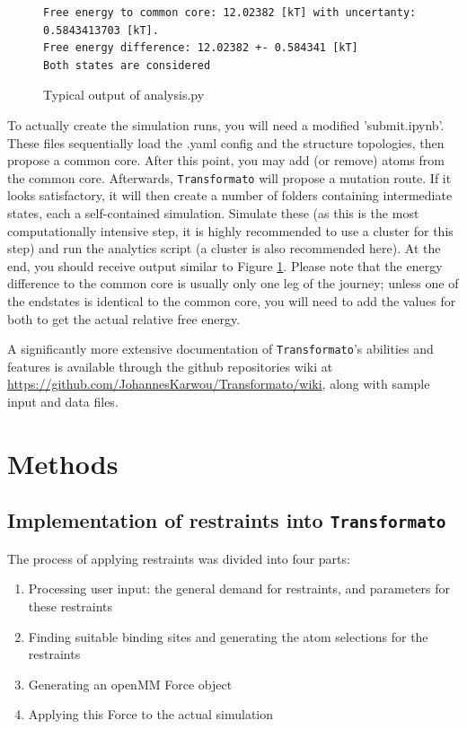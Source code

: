 \documentclass[oneside]{scrreprt}
\begin{document}
\begin{figure}\small

\begin{verbatim}
Free energy to common core: 12.02382 [kT] with uncertanty: 0.5843413703 [kT].
Free energy difference: 12.02382 +- 0.584341 [kT]
Both states are considered
\end{verbatim}
\label{fig:anaoutput}
\caption{Typical output of analysis.py}
\end{figure}

To actually create the simulation runs, you will need a modified 'submit.ipynb'. These files sequentially load the .yaml config and the structure topologies, then propose a common core. After this point, you may add (or remove) atoms from the common core. Afterwards, \texttt{Transformato} will propose a mutation route. If it looks satisfactory, it will then create a number of folders containing intermediate states, each a self-contained simulation. Simulate these (as this is the most computationally intensive step, it is highly recommended to use a cluster for this step) and run the analytics script (a cluster is also recommended here). At the end, you should receive output similar to Figure \ref{fig:anaoutput}. Please note that the energy difference to the common core is usually only one leg of the journey; unless one of the endstates is identical to the common core, you will need to add the values for both to get the actual relative free energy. 

A significantly more extensive documentation of \texttt{Transformato}'s abilities and features is available through the github repositories wiki at \url{https://github.com/JohannesKarwou/Transformato/wiki}, along with sample input and data files.


\chapter{Methods}
\section{Implementation of restraints into \texttt{Transformato}}

The process of applying restraints was divided into four parts:

\begin{enumerate}
    \item Processing user input: the general demand for restraints, and parameters for these restraints
    \item Finding suitable binding sites and generating the atom selections for the restraints
    \item Generating an openMM Force object
    \item Applying this Force to the actual simulation

\end{enumerate}
\end{document}
